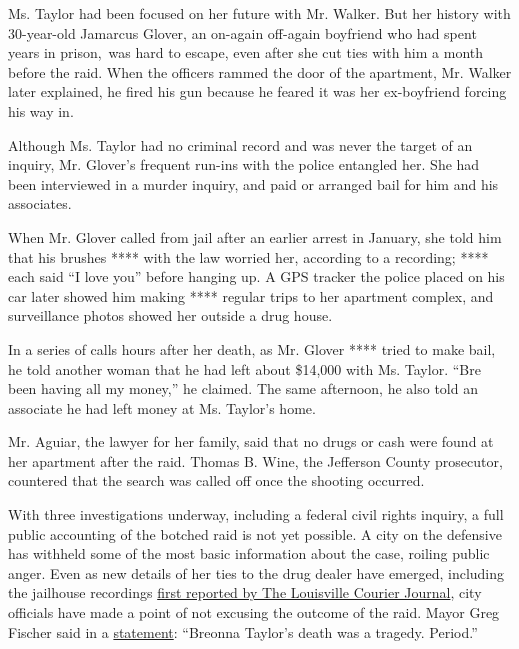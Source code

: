 Ms. Taylor had been focused on her future with Mr. Walker. But her
history with 30-year-old Jamarcus Glover, an on-again off-again
boyfriend who had spent years in prison,~was hard to escape, even after
she cut ties with him a month before the raid. When the officers rammed
the door of the apartment, Mr. Walker later explained, he fired his gun
because he feared it was her ex-boyfriend forcing his way in.

Although Ms. Taylor had no criminal record and was never the target of
an inquiry, Mr. Glover's frequent run-ins with the police entangled her.
She had been interviewed in a murder inquiry, and paid or arranged bail
for him and his associates.

When Mr. Glover called from jail after an earlier arrest in January, she
told him that his brushes **** with the law worried her, according to a
recording; **** each said ``I love you'' before hanging up. A GPS
tracker the police placed on his car later showed him making ****
regular trips to her apartment complex, and surveillance photos showed
her outside a drug house.

In a series of calls hours after her death, as Mr. Glover **** tried to
make bail, he told another woman that he had left about \$14,000 with
Ms. Taylor. ``Bre been having all my money,'' he claimed. The same
afternoon, he also told an associate he had left money at Ms. Taylor's
home.

Mr. Aguiar, the lawyer for her family, said that no drugs or cash were
found at her apartment after the raid. Thomas B. Wine, the Jefferson
County prosecutor, countered that the search was called off once the
shooting occurred.

With three investigations underway, including a federal civil rights
inquiry, a full public accounting of the botched raid is not yet
possible. A city on the defensive has withheld some of the most basic
information about the case, roiling public anger. Even as new details of
her ties to the drug dealer have emerged, including the jailhouse
recordings
\href{https://www.courier-journal.com/story/news/local/breonna-taylor/2020/08/25/report-details-why-louisville-police-decided-to-forcibly-search-breonna-taylor-home/5593502002/}{first
reported by The Louisville Courier Journal}, city officials have made a
point of not excusing the outcome of the raid. Mayor Greg Fischer said
in a
\href{https://twitter.com/louisvillemayor/status/1298243342128615427}{statement}:
``Breonna Taylor's death was a tragedy. Period.''


